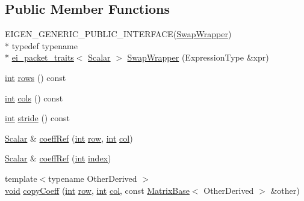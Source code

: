 \subsection*{Public Member Functions}
\begin{DoxyCompactItemize}
\item 
E\-I\-G\-E\-N\-\_\-\-G\-E\-N\-E\-R\-I\-C\-\_\-\-P\-U\-B\-L\-I\-C\-\_\-\-I\-N\-T\-E\-R\-F\-A\-C\-E(\hyperlink{class_swap_wrapper}{Swap\-Wrapper}) \\*
typedef typename \\*
\hyperlink{structei__packet__traits}{ei\-\_\-packet\-\_\-traits}$<$ \hyperlink{class_matrix_base_a625df8339dc2d816cbc0fd66e7dadaf5}{Scalar} $>$ \hyperlink{class_swap_wrapper_af1a6464bfb8a5dc7d2a58cf2731f8911}{Swap\-Wrapper} (Expression\-Type \&xpr)
\item 
\hyperlink{ioapi_8h_a787fa3cf048117ba7123753c1e74fcd6}{int} \hyperlink{class_swap_wrapper_ac66b08b6ae0345288285d2335a087bcf}{rows} () const 
\item 
\hyperlink{ioapi_8h_a787fa3cf048117ba7123753c1e74fcd6}{int} \hyperlink{class_swap_wrapper_ac5a368f28fdafb238dc4d5c36f167e85}{cols} () const 
\item 
\hyperlink{ioapi_8h_a787fa3cf048117ba7123753c1e74fcd6}{int} \hyperlink{class_swap_wrapper_a706bb2a177f83460ca70065e6fa07018}{stride} () const 
\item 
\hyperlink{class_matrix_base_a625df8339dc2d816cbc0fd66e7dadaf5}{Scalar} \& \hyperlink{class_swap_wrapper_a92f90138570986d11826e280376044fc}{coeff\-Ref} (\hyperlink{ioapi_8h_a787fa3cf048117ba7123753c1e74fcd6}{int} \hyperlink{glext_8h_a11b277b422822f784ee248b43eee3e1e}{row}, \hyperlink{ioapi_8h_a787fa3cf048117ba7123753c1e74fcd6}{int} \hyperlink{class_matrix_base_ae3c94b0f25b4273c7a8125169bdf60e0}{col})
\item 
\hyperlink{class_matrix_base_a625df8339dc2d816cbc0fd66e7dadaf5}{Scalar} \& \hyperlink{class_swap_wrapper_a14d48ff36761d24465b2a6dbb8b54376}{coeff\-Ref} (\hyperlink{ioapi_8h_a787fa3cf048117ba7123753c1e74fcd6}{int} \hyperlink{glext_8h_ab47dd9958bcadea08866b42bf358e95e}{index})
\item 
{\footnotesize template$<$typename Other\-Derived $>$ }\\\hyperlink{group___u_a_v_objects_plugin_ga444cf2ff3f0ecbe028adce838d373f5c}{void} \hyperlink{class_swap_wrapper_afde76a2637f9495d81237df12290984e}{copy\-Coeff} (\hyperlink{ioapi_8h_a787fa3cf048117ba7123753c1e74fcd6}{int} \hyperlink{glext_8h_a11b277b422822f784ee248b43eee3e1e}{row}, \hyperlink{ioapi_8h_a787fa3cf048117ba7123753c1e74fcd6}{int} \hyperlink{class_matrix_base_ae3c94b0f25b4273c7a8125169bdf60e0}{col}, const \hyperlink{class_matrix_base}{Matrix\-Base}$<$ Other\-Derived $>$ \&other)

\end{DoxyCompactItemize}
